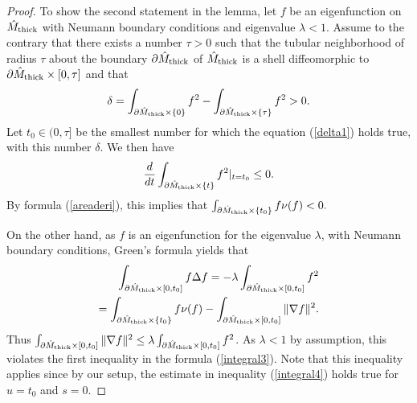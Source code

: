 \documentclass[11pt]{amsart}
\theoremstyle{plain}
\theoremstyle{plain}
\theoremstyle{definition}
\begin{document}
\begin{proof}
To show the second statement in the lemma,
let $f$ be an eigenfunction on $\hat M_{\rm thick}$
with Neumann boundary conditions and eigenvalue $\lambda <1$.
Assume to the contrary that there exists a number 
$\tau>0$ such that
the tubular neighborhood of radius $\tau$ about the boundary
$\partial \hat M_{\rm thick}$ of $\hat M_{\rm thick}$ is a shell
diffeomorphic to $\partial \hat M_{\rm thick}\times [0,\tau]$
and that 
\begin{equation}\label{delta1}
\delta=\int_{\partial \hat M_{\rm thick}\times \{0\}}f^2-
\int_{\partial \hat M_{\rm thick}\times \{\tau\}}f^2>0.\end{equation}
Let $t_0\in (0,\tau]$ be the smallest number for which 
the equation (\ref{delta1}) holds true, with this number $\delta$. We then have
\[\frac{d}{dt}\int_{\partial \hat M_{\rm thick}\times \{t\}}f^2\vert_{t=t_0}\leq 0.\]
By formula (\ref{areaderi}), this
implies that $\int_{\partial \hat M_{\rm thick}\times \{t_0\}}
f\nu(f)<0.$

On the other hand, as $f$ is an eigenfunction for the
eigenvalue $\lambda$, with Neumann boundary conditions,
Green's formula yields that 
\begin{align}
\int_{\partial \hat M_{\rm thick}\times [0,t_0]}f\Delta f=
-\lambda \int_{\partial \hat M_{\rm thick}\times [0,t_0]}f^2\notag \\=
\int_{\partial \hat M_{\rm thick}\times \{t_0\}}f\nu(f)-
\int_{\partial \hat M_{\rm thick}\times [0,t_0]}\Vert \nabla f\Vert^2.\notag
\end{align}
Thus $\int_{\partial \hat M_{\rm thick}\times [0,t_0]}\Vert \nabla f\Vert^2\leq 
\lambda \int_{\partial \hat M_{\rm thick}\times [0,t_0]}f^2$.
As $\lambda <1$ by assumption, this violates the 
first inequality in the formula (\ref{integral3}). Note that this
inequality applies since by our setup, the estimate in
inequality (\ref{integral4}) holds true for $u=t_0$ and $s=0$. 
\end{proof}
\end{document}
